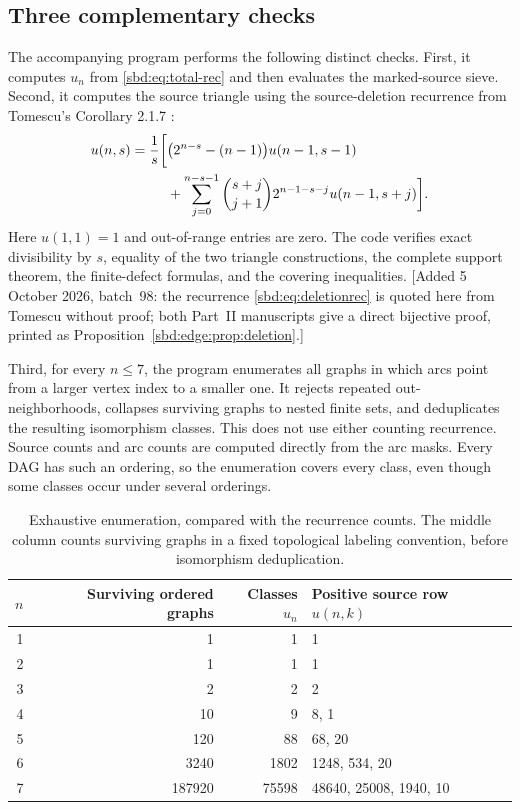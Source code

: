 \documentclass[11pt,a4paper]{article}
\theoremstyle{definition}
\begin{document}
\subsection{Three complementary checks}
The accompanying program performs the following distinct checks.
First, it computes $u_n$ from \eqref{sbd:eq:total-rec} and then evaluates the
marked-source sieve. Second, it computes the source triangle using the
source-deletion recurrence from Tomescu's Corollary 2.1.7
\cite{tomescu}:
\begin{align}\label{sbd:eq:deletionrec}
 u(n,s)=\frac1s\bigg[&\bigl(2^{n-s}-(n-1)\bigr)u(n-1,s-1)\notag\\
 &+\sum_{j=0}^{n-s-1}\binom{s+j}{j+1}
              2^{n-1-s-j}u(n-1,s+j)\bigg].
\end{align}
Here $u(1,1)=1$ and out-of-range entries are zero. The code verifies
exact divisibility by $s$, equality of the two triangle constructions,
the complete support theorem, the finite-defect formulas, and the
covering inequalities.
[Added 5 October 2026, batch~98: the recurrence \eqref{sbd:eq:deletionrec} is
quoted here from Tomescu without proof; both Part~II manuscripts give a direct
bijective proof, printed as Proposition~\ref{sbd:edge:prop:deletion}.]

Third, for every $n\le7$, the program enumerates all graphs in which
arcs point from a larger vertex index to a smaller one. It rejects
repeated out-neighborhoods, collapses surviving graphs to nested finite
sets, and deduplicates the resulting isomorphism classes. This does not
use either counting recurrence. Source counts and arc counts are
computed directly from the arc masks. Every DAG has such an ordering,
so the enumeration covers every class, even though some classes occur
under several orderings.

\begin{table}[htbp]
\centering
\caption{Exhaustive enumeration, compared with the recurrence counts.
The middle column counts surviving graphs in a fixed topological
labeling convention, before isomorphism deduplication.}
\begin{tabular}{r r r l}
\toprule
$n$ & Surviving ordered graphs & Classes $u_n$ & Positive source row $u(n,k)$\\
\midrule
1&1&1&1\\
2&1&1&1\\
3&2&2&2\\
4&10&9&8, 1\\
5&120&88&68, 20\\
6&3240&1802&1248, 534, 20\\
7&187920&75598&48640, 25008, 1940, 10\\
\bottomrule
\end{tabular}
\end{table}
\end{document}
